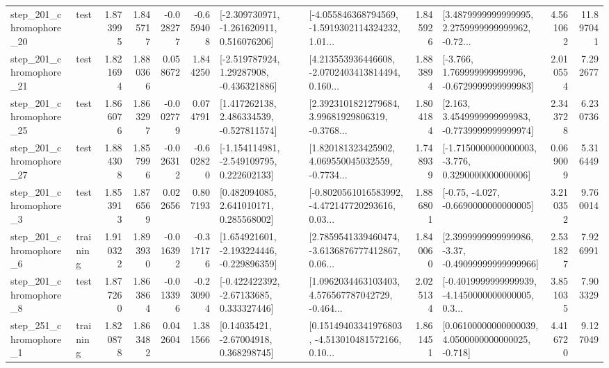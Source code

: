 \begin{tabular}{llrrrrllrlrr}
  step\_201\_chromophore\_20 &      test &      1.873995 &    1.845717 &     -0.028277 & -0.659408 &   [-2.309730971, -1.261620911, 0.516076206] &  [-4.055846368794569, -1.5919302114324232, 1.01... &       1.845926 &  [3.4879999999999995, 2.2759999999999962, -0.72... &            4.561062 &         11.897041 \\
  step\_201\_chromophore\_21 &      test &      1.821694 &    1.880366 &      0.058672 &  1.844250 &    [-2.519787924, 1.29287908, -0.436321886] &  [4.213553936446608, -2.0702403413814494, 0.160... &       1.883894 &   [-3.766, 1.769999999999996, -0.6729999999999983] &            2.010554 &          7.292677 \\
  step\_201\_chromophore\_25 &      test &      1.866076 &    1.863297 &     -0.002779 &  0.074791 &    [1.417262138, 2.486334539, -0.527811574] &  [2.3923101821279684, 3.99681929806319, -0.3768... &       1.804184 &   [2.163, 3.4549999999999983, -0.7739999999999974] &            2.343728 &          6.230736 \\
  step\_201\_chromophore\_27 &      test &      1.884308 &    1.857996 &     -0.026312 & -0.602820 &   [-1.154114981, -2.549109795, 0.222602133] &  [1.820181323425902, 4.069550045032559, -0.7734... &       1.748939 &  [-1.7150000000000003, -3.776, 0.3290000000000006] &            0.069009 &          5.316449 \\
   step\_201\_chromophore\_3 &      test &      1.853913 &    1.876569 &      0.022656 &  0.807193 &     [0.482094085, 2.641010171, 0.285568002] &  [-0.8020561016583992, -4.472147720293616, 0.03... &       1.886801 &               [-0.75, -4.027, -0.6690000000000005] &            3.210352 &          9.760014 \\
   step\_201\_chromophore\_6 &  training &      1.910322 &    1.893930 &     -0.016392 & -0.317176 &   [1.654921601, -2.193224446, -0.229896359] &  [2.7859541339460474, -3.6136876777412867, 0.06... &       1.840060 &  [2.3999999999999986, -3.37, -0.49099999999999966] &            2.531827 &          7.926991 \\
   step\_201\_chromophore\_8 &      test &      1.877260 &    1.863864 &     -0.013396 & -0.230904 &    [-0.422422392, -2.67133685, 0.333327446] &  [1.0962034463103403, 4.576567787042729, -0.464... &       2.025134 &  [-0.4019999999999939, -4.1450000000000005, 0.3... &            3.851035 &          7.903329 \\
   step\_251\_chromophore\_1 &  training &      1.820878 &    1.863482 &      0.042604 &  1.381566 &      [0.14035421, -2.67004918, 0.368298745] &  [0.15149403341976803, -4.513010481572166, 0.10... &       1.861451 &  [0.06100000000000039, 4.0500000000000025, -0.718] &            4.416720 &          9.127049 \\

\end{tabular}

